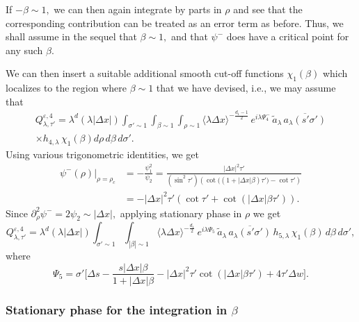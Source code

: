 \documentclass[leqno]{amsart}
\theoremstyle{definition}
\theoremstyle{remark}
\numberwithin{equation}{section}
\newcommand{\jp}[1]{\langle{#1}\rangle}
\newcommand\la{{\lambda}}
\begin{document}
If  $-\beta\sim 1,$ we can then again integrate by parts in $\rho$ and see that the corresponding contribution can be treated as an error term as before. Thus, we shall assume in the sequel that $\beta\sim 1,$ and that $\psi^-$ does have a critical point for any such $\beta.$ 

We can then  insert a suitable additional smooth cut-off functions $\chi_1(\beta)$  which localizes to  the region where 
$\beta\sim 1$ that we have devised, i.e., we may assume that 
 \begin{multline*}
Q^{\varepsilon,4}_{\lambda,\tau'}=\lambda^d (\la |\Delta x|) \int_{\sigma' \sim 1} \int_{\beta\sim 1} \int_{\rho \sim 1} \jp{\lambda\Delta x}^{-\frac{d_1-1}2} \, e^{i\lambda \Psi_4^-} \, \tilde a_\la \,\overline{a_\lambda(s'\sigma')}  \\ \times h_{4,\lambda}\, \chi_1(\beta) d\rho \, d\beta \, d\sigma'.
\end{multline*}
Using various trigonometric identities, we get
\begin{align*}
 \psi^-(\rho) |_{\rho = \rho_c}
& = - \frac{\psi_1^2}{\psi_2} = \frac{\left|\Delta x\right|^2 \tau' }{(\sin^2 \tau') \left(\cot\big((1 + \left|\Delta x\right|\beta) \tau' \big)-\cot \tau' \right)}\\
 & = - \left|\Delta x\right|^2  \tau' (\cot \tau' + \cot(\left|\Delta x\right|\beta \tau' )).
\end{align*}
 Since $\partial_\rho^2 \psi^-=2\psi_2\sim |\Delta x|,$ applying stationary phase in $\rho$ we get
\begin{equation}
Q^{\varepsilon,4}_{\lambda,\tau'}=\lambda^d (\la |\Delta x|) \int_{\sigma' \sim 1} \int_{|\beta|\sim 1} \jp{\lambda\Delta x}^{-\frac{d_1}2} \, e^{i\lambda \Psi_5} \, \tilde a_\la \,\overline{a_\lambda(s'\sigma')}  \, h_{5,\lambda}\,\chi_1(\beta)\, d\beta \, d\sigma',\label{Q5}
\end{equation}
where
\[
\Psi_5 = \sigma'\Big[\Delta s -\frac{s\left|\Delta x\right| \beta }{1 + \left|\Delta x\right|\beta} 
 - \left|\Delta x\right|^2 \tau' \cot(\left|\Delta x\right| \beta \tau' ) + 4\tau' \Delta w\Big].
\]

 
\subsubsection{Stationary phase for the integration in $\beta$}
\end{document}
